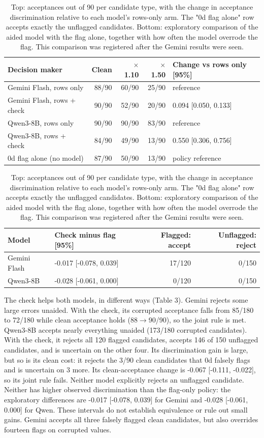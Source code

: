 \documentclass[letterpaper]{article}
\begin{document}
\begin{table}[tbp]
\centering
{\small
\setlength{\tabcolsep}{3pt}
\begin{tabular}{lrrrl}
\toprule
Decision maker & Clean & \(\times\)1.10 & \(\times\)1.50 & Change vs rows only [95\%] \\ \midrule
Gemini Flash, rows only & 88/90 & 60/90 & 25/90 & reference \\
Gemini Flash, rows + check & 90/90 & 52/90 & 20/90 & 0.094 [0.050, 0.133] \\
Qwen3-8B, rows only & 90/90 & 90/90 & 83/90 & reference \\
Qwen3-8B, rows + check & 84/90 & 49/90 & 13/90 & 0.550 [0.306, 0.756] \\
0d flag alone (no model) & 87/90 & 50/90 & 13/90 & policy reference \\
\bottomrule
\end{tabular}
}


\par\medskip
{\small
\setlength{\tabcolsep}{3pt}
\begin{tabular}{llrr}
\toprule
Model & Check minus flag [95\%] & Flagged: accept & Unflagged: reject \\ \midrule
Gemini Flash & -0.017 [-0.078, 0.039] & 17/120 & 0/150 \\
Qwen3-8B & -0.028 [-0.061, 0.000] & 0/120 & 0/150 \\
\bottomrule
\end{tabular}
}
\caption{Top: acceptances out of 90 per candidate type, with the change in acceptance discrimination relative to each model's rows-only arm. The "0d flag alone" row accepts exactly the unflagged candidates. Bottom: exploratory comparison of the aided model with the flag alone, together with how often the model overrode the flag. This comparison was registered after the Gemini results were seen.}
\label{tab:monitor}
\end{table}

The check helps both models, in different ways (Table 3). Gemini rejects some large errors unaided. With the check, its corrupted acceptance falls from 85/180 to 72/180 while clean acceptance holds (88\(\rightarrow\)90/90), so the joint rule is met. Qwen3-8B accepts nearly everything unaided (173/180 corrupted candidates). With the check, it rejects all 120 flagged candidates, accepts 146 of 150 unflagged candidates, and is uncertain on the other four. Its discrimination gain is large, but so is its clean cost: it rejects the 3/90 clean candidates that 0d falsely flags and is uncertain on 3 more. Its clean-acceptance change is -0.067 [-0.111, -0.022], so its joint rule fails. Neither model explicitly rejects an unflagged candidate. Neither has higher observed discrimination than the flag-only policy: the exploratory differences are -0.017 [-0.078, 0.039] for Gemini and -0.028 [-0.061, 0.000] for Qwen. These intervals do not establish equivalence or rule out small gains. Gemini accepts all three falsely flagged clean candidates, but also overrides fourteen flags on corrupted values.
\end{document}
